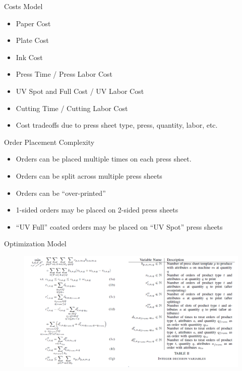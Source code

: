 \documentclass[10pt,utf8,presentation]{beamer}
\begin{document}
\begin{frame}{Costs Model}
 \begin{itemize}
  \item Paper Cost
  \item Plate Cost
  \item Ink Cost
  \item Press Time / Press Labor Cost
  \item UV Spot and Full Cost / UV Labor Cost
  \item Cutting Time / Cutting Labor Cost
  \item Cost tradeoffs due to press sheet type, press,
    quantity, labor, etc.

 \end{itemize}

\end{frame}

\begin{frame}{Order Placement Complexity}

\begin{itemize}
 \item Orders can be placed multiple times on each press
sheet.
 \item Orders can be split across multiple press sheets
 \item Orders can be “over-printed”
 \item 1-sided orders may be placed on 2-sided press sheets
 \item “UV Full” coated orders may be placed on “UV Spot”
press sheets

\end{itemize}


\end{frame}

\begin{frame}{Optimization Model}

\begin{figure}
\includegraphics[scale=0.3]{fig/opt_problem.png}
\end{figure}

\end{frame}
\end{document}
